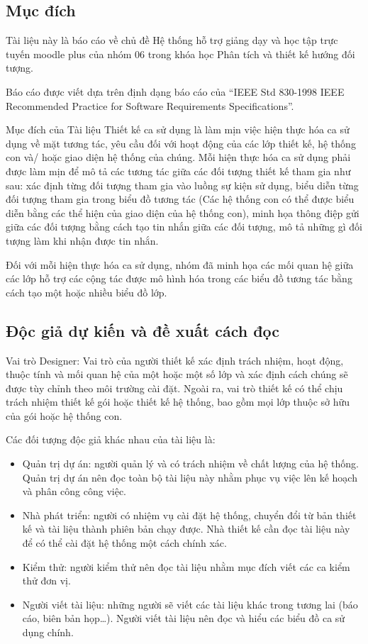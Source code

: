 \documentclass[./../main.tex]{subfiles}
\begin{document}
\subsection{Mục đích}
Tài liệu này là báo cáo về chủ đề Hệ thống hỗ trợ giảng dạy và học tập trực tuyến moodle plus của nhóm 06 trong khóa học Phân tích và thiết kế hướng đối tượng.

Báo cáo được viết dựa trên định dạng báo cáo của  “IEEE Std 830-1998 IEEE Recommended Practice for Software Requirements Specifications”.

Mục đích của Tài liệu Thiết kế ca sử dụng là làm mịn việc hiện thực hóa ca sử dụng về mặt tương tác, yêu cầu đối với hoạt động của các lớp thiết kế, hệ thống con và/ hoặc giao diện hệ thống của chúng.
Mỗi hiện thực hóa ca sử dụng phải được làm mịn để mô tả các tương tác giữa các đối tượng thiết kế tham gia như sau: xác định từng đối tượng tham gia vào luồng sự kiện sử dụng, biểu diễn từng đối tượng tham gia trong biểu đồ  tương tác (Các hệ thống con có thể được biểu diễn bằng các thể hiện của giao diện của hệ thống con), minh họa thông điệp gửi giữa các đối tượng bằng cách tạo tin nhắn giữa các đối tượng, mô tả những gì đối tượng làm khi nhận được tin nhắn.

Đối với mỗi hiện thực hóa ca sử dụng, nhóm đã minh họa các mối quan hệ giữa các lớp hỗ trợ các cộng tác được mô hình hóa trong các biểu đồ tương tác bằng cách tạo một hoặc nhiều biểu đồ lớp.

\subsection{Độc giả dự kiến và đề xuất cách đọc}

Vai trò Designer: Vai trò của người thiết kế xác định trách nhiệm, hoạt động, thuộc tính và mối quan hệ của một hoặc một số lớp và xác định cách chúng sẽ được tùy chỉnh theo môi trường cài đặt. Ngoài ra, vai trò thiết kế có thể chịu trách nhiệm thiết kế gói hoặc thiết kế hệ thống, bao gồm mọi lớp thuộc sở hữu của gói hoặc hệ thống con.

Các đối tượng độc giả khác nhau của tài liệu là:
\begin{itemize}
    \item Quản trị dự án: người quản lý và có trách nhiệm về chất lượng của hệ thống. Quản trị dự án nên đọc toàn bộ tài liệu này nhằm phục vụ việc lên kế hoạch và phân công công việc.
    \item Nhà phát triển: người có nhiệm vụ cài đặt hệ thống, chuyển đổi từ bản thiết kế và tài liệu thành phiên bản chạy được. Nhà thiết kế cần đọc tài liệu này để có thể cài đặt hệ thống một cách chính xác.
    \item Kiểm thử: người kiểm thử nên đọc tài liệu nhằm mục đích viết các ca kiểm thử đơn vị.
    \item Người viết tài liệu: những người sẽ viết các tài liệu khác trong tương lai (báo cáo, biên bản họp…). Người viết tài liệu nên đọc và hiểu các biểu đồ ca sử dụng chính.
\end{itemize}
\end{document}
